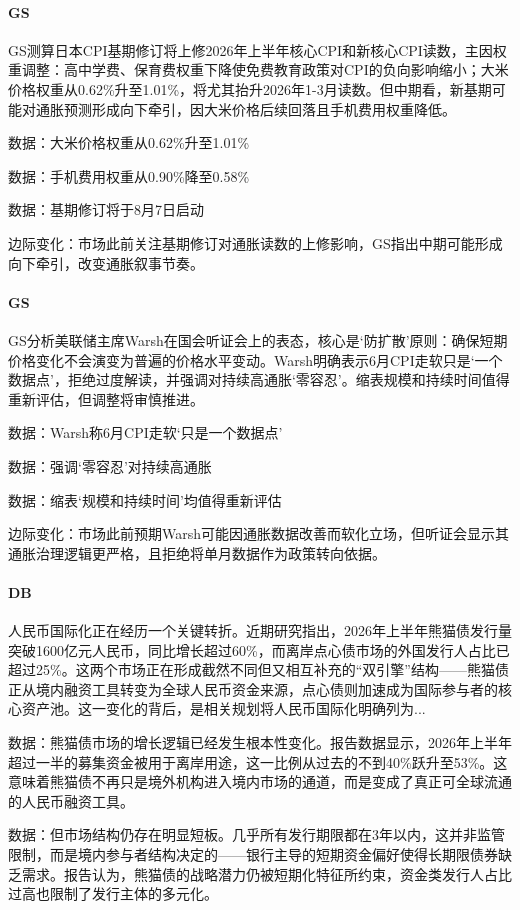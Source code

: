 \documentclass[11pt]{ctexart}
\begin{document}
\paragraph{GS} GS测算日本CPI基期修订将上修2026年上半年核心CPI和新核心CPI读数，主因权重调整：高中学费、保育费权重下降使免费教育政策对CPI的负向影响缩小；大米价格权重从0.62\%升至1.01\%，将尤其抬升2026年1-3月读数。但中期看，新基期可能对通胀预测形成向下牵引，因大米价格后续回落且手机费用权重降低。
{\small\color{refgray}数据：大米价格权重从0.62\%升至1.01\%\par}
{\small\color{refgray}数据：手机费用权重从0.90\%降至0.58\%\par}
{\small\color{refgray}数据：基期修订将于8月7日启动\par}
{\small\color{refgray}边际变化：市场此前关注基期修订对通胀读数的上修影响，GS指出中期可能形成向下牵引，改变通胀叙事节奏。\par}
\paragraph{GS} GS分析美联储主席Warsh在国会听证会上的表态，核心是‘防扩散’原则：确保短期价格变化不会演变为普遍的价格水平变动。Warsh明确表示6月CPI走软只是‘一个数据点’，拒绝过度解读，并强调对持续高通胀‘零容忍’。缩表规模和持续时间值得重新评估，但调整将审慎推进。
{\small\color{refgray}数据：Warsh称6月CPI走软‘只是一个数据点’\par}
{\small\color{refgray}数据：强调‘零容忍’对持续高通胀\par}
{\small\color{refgray}数据：缩表‘规模和持续时间’均值得重新评估\par}
{\small\color{refgray}边际变化：市场此前预期Warsh可能因通胀数据改善而软化立场，但听证会显示其通胀治理逻辑更严格，且拒绝将单月数据作为政策转向依据。\par}
\paragraph{DB} 人民币国际化正在经历一个关键转折。近期研究指出，2026年上半年熊猫债发行量突破1600亿元人民币，同比增长超过60\%，而离岸点心债市场的外国发行人占比已超过25\%。这两个市场正在形成截然不同但又相互补充的“双引擎”结构——熊猫债正从境内融资工具转变为全球人民币资金来源，点心债则加速成为国际参与者的核心资产池。这一变化的背后，是相关规划将人民币国际化明确列为...
{\small\color{refgray}数据：熊猫债市场的增长逻辑已经发生根本性变化。报告数据显示，2026年上半年超过一半的募集资金被用于离岸用途，这一比例从过去的不到40\%跃升至53\%。这意味着熊猫债不再只是境外机构进入境内市场的通道，而是变成了真正可全球流通的人民币融资工具。\par}
{\small\color{refgray}数据：但市场结构仍存在明显短板。几乎所有发行期限都在3年以内，这并非监管限制，而是境内参与者结构决定的——银行主导的短期资金偏好使得长期限债券缺乏需求。报告认为，熊猫债的战略潜力仍被短期化特征所约束，资金类发行人占比过高也限制了发行主体的多元化。\par}
\end{document}
